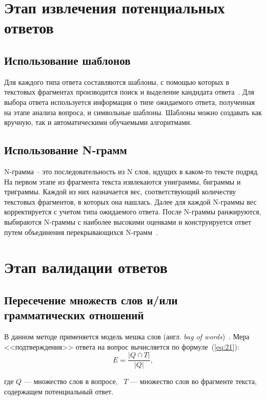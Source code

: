 \section{Этап извлечения потенциальных ответов}

\subsection{Использование шаблонов}

Для каждого типа ответа составляются шаблоны, с помощью которых в текстовых фрагментах производится поиск и выделение кандидата ответа~\cite{patterns}. Для выбора ответа используется информация о типе ожидаемого ответа, полученная на этапе анализа вопроса, и символьные шаблоны. Шаблоны можно создавать как вручную, так и автоматическими обучаемыми алгоритмами.

\subsection{Использование N-грамм}

N-грамма – это последовательность из N слов, идущих в каком-то тексте подряд. На первом этапе из фрагмента текста извлекаются униграммы, биграммы и триграммы. Каждой из них назначается вес, соответствующий количеству текстовых фрагментов, в которых она нашлась. Далее для каждой N-граммы вес корректируется с учетом типа ожидаемого ответа. После N-граммы ранжируются, выбираются N-граммы с наиболее высокими оценками и конструируется ответ путем объединения перекрывающихся N-грамм~\cite{ngramms}.

\section{Этап валидации ответов}

\subsection{Пересечение множеств слов и/или грамматических отношений}
В данном методе применяется модель мешка слов (англ. \textit{bag of words})~\cite{bag}.
Мера <<подтверждения>> ответа на вопрос вычисляется по формуле~(\ref{eq:21}):
\begin{equation}\label{eq:21}
	 E = \frac{|{Q}\cap{T}|}{|Q|},
\end{equation}

\noindent где $Q$ --- множество слов в вопросе, ~$T$ --- множество слов во фрагменте текста, содержащем потенциальный ответ.

